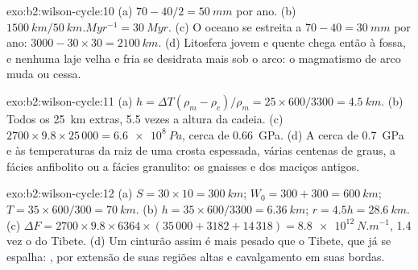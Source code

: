 \begin{solution}{exo:b2:wilson-cycle:10}
(a) $70 - 40/2 = \qty{50}{mm}$ por ano. (b) $\qty{1500}{km}/\qty{50}{km.Myr^{-1}} =
\qty{30}{Myr}$. (c) O oceano se estreita a $70 - 40 = \qty{30}{mm}$ por ano: $3000 - 30\times30 =
\qty{2100}{km}$. (d) Litosfera jovem e quente chega então à fossa, e nenhuma laje velha e fria
se desidrata mais sob o arco: o magmatismo de arco muda ou cessa.
\end{solution}

\begin{solution}{exo:b2:wilson-cycle:11}
(a) $h = \Delta T(\rho_m - \rho_c)/\rho_m = 25\times600/3300 = \qty{4.5}{km}$. (b) Todos os
\qty{25}{km} extras, 5.5 vezes a altura da cadeia. (c) $2700\times9.8\times25\,000 =
\qty{6.6e8}{Pa}$, cerca de \qty{0.66}{GPa}. (d) A cerca de \qty{0.7}{GPa} e às temperaturas da
raiz de uma crosta espessada, várias centenas de graus, a fácies anfibolito ou a fácies
granulito: os gnaisses e  dos maciços antigos.
\end{solution}

\begin{solution}{exo:b2:wilson-cycle:12}
(a) $S = 30\times10 = \qty{300}{km}$; $W_0 = 300 + 300 = \qty{600}{km}$; $T = 35\times600/300 =
\qty{70}{km}$. (b) $h = 35\times600/3300 = \qty{6.36}{km}$; $r = 4.5h = \qty{28.6}{km}$.
(c) $\Delta F = 2700\times9.8\times6364\times(35\,000 + 3182 + 14\,318) =
\qty{8.8e12}{N.m^{-1}}$, 1.4 vez o do Tibete. (d) Um cinturão assim é mais pesado que o Tibete, que já
se espalha: , por extensão de suas regiões altas e cavalgamento em suas bordas.
\end{solution}

